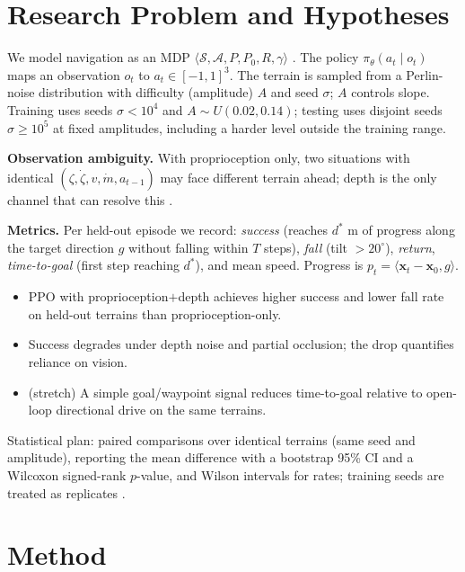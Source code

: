 \documentclass[conference]{IEEEtran}
\newcommand{\hyp}[1]{\textbf{#1}}
\begin{document}
\section{Research Problem and Hypotheses}
We model navigation as an MDP $\langle \mathcal{S},\mathcal{A},P,P_0,R,\gamma\rangle$ \cite{schulman2017}. The policy $\pi_\theta(a_t\mid o_t)$ maps an observation $o_t$ to $a_t\in[-1,1]^3$. The terrain is sampled from a Perlin-noise distribution \cite{perlin1985} with difficulty (amplitude) $A$ and seed $\sigma$; $A$ controls slope. Training uses seeds $\sigma<10^4$ and $A\sim U(0.02,0.14)$; testing uses disjoint seeds $\sigma\ge 10^5$ at fixed amplitudes, including a harder level outside the training range.

\textbf{Observation ambiguity.} With proprioception only, two situations with identical $(\zeta,\dot\zeta,v,\dot m,a_{t-1})$ may face different terrain ahead; depth is the only channel that can resolve this \cite{salehi2025}.

\textbf{Metrics.} Per held-out episode we record: \emph{success} (reaches $d^\ast$ m of progress along the target direction $g$ without falling within $T$ steps), \emph{fall} (tilt $>20^\circ$), \emph{return}, \emph{time-to-goal} (first step reaching $d^\ast$), and mean speed. Progress is $p_t=\langle \mathbf{x}_t - \mathbf{x}_0, g\rangle$.

\begin{itemize}
\item[\hyp{H1}] PPO with proprioception$+$depth achieves higher success and lower fall rate on held-out terrains than proprioception-only.
\item[\hyp{H2}] Success degrades under depth noise and partial occlusion; the drop quantifies reliance on vision.
\item[\hyp{H3}] (stretch) A simple goal/waypoint signal reduces time-to-goal relative to open-loop directional drive on the same terrains.
\end{itemize}
Statistical plan: paired comparisons over identical terrains (same seed and amplitude), reporting the mean difference with a bootstrap 95\% CI and a Wilcoxon signed-rank $p$-value, and Wilson intervals for rates; training seeds are treated as replicates \cite{henderson2018,agarwal2021}.

\section{Method}
\end{document}
